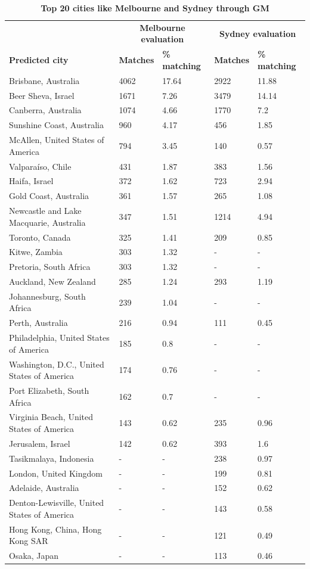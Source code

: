 \documentclass[10pt,letterpaper,hidelinks]{article}
\begin{document}
\begin{table}[!htbp]
\begin{adjustwidth}{-2.25in}{0in}
\caption{\bf Top 20 cities like Melbourne and Sydney through GM \label{tab:melbournesydneyGM}}     
\begin{tabular}{ l l l l l}
 \hline    &  \multicolumn{2}{c}{\textbf{Melbourne evaluation}} & \multicolumn{2}{c}{\textbf{Sydney evaluation}}  \\  
\textbf{Predicted city} & \textbf{Matches} & \textbf{\% matching}  & \textbf{Matches} & \textbf{\% matching}\\ \hline

Brisbane, Australia & 4062 & 17.64 & 2922 & 11.88      \\ 
Beer Sheva, Israel & 1671 & 7.26 & 3479 & 14.14      \\ 
Canberra, Australia & 1074 & 4.66 & 1770 & 7.2      \\
Sunshine Coast, Australia & 960 & 4.17 & 456 & 1.85      \\
McAllen, United States of America & 794 & 3.45 & 140 & 0.57      \\
Valpara\'{i}so, Chile & 431 & 1.87 & 383 & 1.56      \\
Haifa, Israel & 372 & 1.62 & 723 & 2.94      \\
Gold Coast, Australia & 361 & 1.57 & 265 & 1.08      \\
Newcastle and Lake Macquarie, Australia & 347 & 1.51 & 1214 & 4.94      \\
Toronto, Canada & 325 & 1.41 & 209 & 0.85      \\
Kitwe, Zambia & 303 & 1.32 & - & -      \\
Pretoria, South Africa & 303 & 1.32 & - & -      \\
Auckland, New Zealand & 285 & 1.24 & 293 & 1.19      \\
Johannesburg, South Africa & 239 & 1.04 & - & -      \\
Perth, Australia & 216 & 0.94 & 111 & 0.45      \\
Philadelphia, United States of America & 185 & 0.8 & - & -      \\
Washington, D.C., United States of America & 174 & 0.76 & - & -      \\
Port Elizabeth, South Africa & 162 & 0.7 & - & -      \\
Virginia Beach, United States of America & 143 & 0.62 & 235 & 0.96      \\
Jerusalem, Israel & 142 & 0.62 & 393 & 1.6      \\
Tasikmalaya, Indonesia & - & - & 238 & 0.97      \\		
London, United Kingdom & - & - & 199 & 0.81      \\
Adelaide, Australia & - & - & 152 & 0.62      \\
Denton-Lewisville, United States of America & - & - & 143 & 0.58      \\						
Hong Kong, China, Hong Kong SAR & - & - & 121 & 0.49      \\		
Osaka, Japan & - & - & 113 & 0.46      \\


\end{tabular}
\end{adjustwidth}
\end{table}
\end{document}
